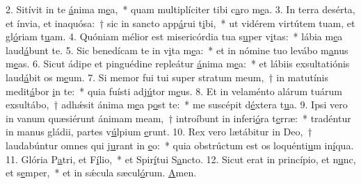 2. Sitívit in te \uline{á}nima m\uline{e}a,~* quam multiplíciter tibi c\uline{a}ro m\uline{e}a.
3. In terra desérta, et ínvia, et inaquósa:~† sic in sancto app\uline{á}rui t\uline{i}bi,~* ut vidérem virtútem tuam, et gl\uline{ó}riam t\uline{u}am.
4. Quóniam mélior est misericórdia tua s\uline{u}per v\uline{i}tas:~* lábia m\uline{e}a laud\uline{á}bunt te.
5. Sic benedícam te in v\uline{i}ta m\uline{e}a:~* et in nómine tuo levábo m\uline{a}nus m\uline{e}as.
6. Sicut ádipe et pinguédine repleátur \uline{á}nima m\uline{e}a:~* et lábiis exsultatiónis laud\uline{á}bit os m\uline{e}um.
7. Si memor fui tui super stratum meum,~† in matutínis medit\uline{á}bor \uline{i}n te:~* quia fuísti adj\uline{ú}tor m\uline{e}us.
8. Et in velaménto alárum tuárum exsultábo,~† adhǽsit ánima m\uline{e}a p\uline{o}st te:~* me suscépit d\uline{é}xtera t\uline{u}a.
9. Ipsi vero in vanum quæsiérunt ánimam meam,~† introíbunt in inferi\uline{ó}ra t\uline{e}rræ:~* tradéntur in manus gládii, partes v\uline{ú}lpium \uline{e}runt.
10. Rex vero lætábitur in Deo,~† laudabúntur omnes qui j\uline{u}rant in \uline{e}o:~* quia obstrúctum est os loquénti\uline{u}m in\uline{í}qua.
11. Glória P\uline{a}tri, et F\uline{í}lio,~* et Spir\uline{í}tui S\uline{a}ncto.
12. Sicut erat in princípio, et n\uline{u}nc, et s\uline{e}mper,~* et in sǽcula sæcul\uline{ó}rum. \uline{A}men.
